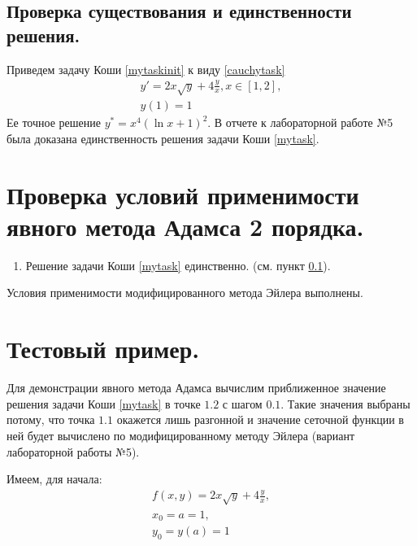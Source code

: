 \documentclass[a4paper, 12pt]{article}
\begin{document}
	\subsection{Проверка существования и единственности решения.}
	\label{solexistance}
	
	Приведем задачу Коши \eqref{mytaskinit} к виду \eqref{cauchytask}
	\begin{equation} \label{mytask}
		\begin{gathered}
			y'=2x\sqrt{y}+4\frac{y}{x}, x\in[1,2],\\
			y(1)=1
		\end{gathered}
	\end{equation}
	Ее точное решение $y^*=x^4(\ln x+1)^2$. В отчете к лабораторной работе №5 была доказана единственность решения задачи Коши \eqref{mytask}.
	
	\section{Проверка условий применимости явного метода Адамса 2 порядка.}
	
	\begin{enumerate}
		\item Решение задачи Коши \eqref{mytask} единственно. (см. пункт \ref{solexistance}).
	\end{enumerate}
	
	Условия применимости модифицированного метода Эйлера выполнены.
	
	\section{Тестовый пример.} \label{testexample}
	
	Для демонстрации явного метода Адамса вычислим приближенное значение решения задачи Коши \eqref{mytask} в точке $1.2$ с шагом $0.1$. Такие значения выбраны потому, что точка $1.1$ окажется лишь разгонной и значение сеточной функции в ней будет вычислено по модифицированному методу Эйлера (вариант лабораторной работы №5).
	
	Имеем, для начала:
	\begin{equation*}
		\begin{gathered}
			f(x,y) = 2x\sqrt{y}+4\frac{y}{x},\\
			x_0 = a = 1,\\
			y_0 = y(a) = 1
		\end{gathered}
	\end{equation*}
	
\end{document}
